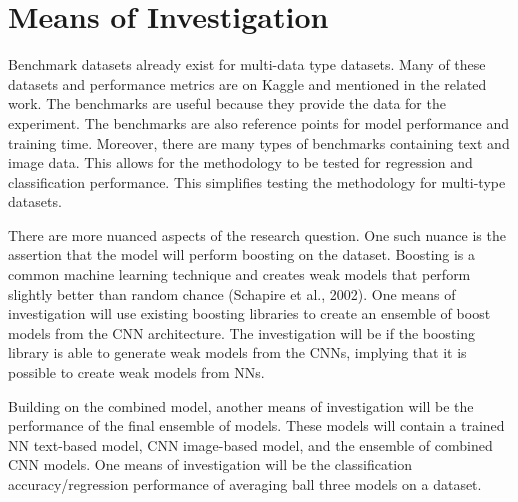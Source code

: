 \section{Means of Investigation} %

Benchmark datasets already exist for multi-data type datasets.  Many of these datasets and performance metrics are on Kaggle and mentioned in the related work.  The benchmarks are useful because they provide the data for the experiment.  The benchmarks are also reference points for model performance and training time.  Moreover, there are many types of benchmarks containing text and image data.  This allows for the methodology to be tested for regression and classification performance.  This simplifies testing the methodology for multi-type datasets.

There are more nuanced aspects of the research question.  One such nuance is the assertion that the model will perform boosting on the dataset.  Boosting is a common machine learning technique and creates weak models that perform slightly better than random chance (Schapire et al., 2002).  One means of investigation will use existing boosting libraries to create an ensemble of boost models from the CNN architecture.  The investigation will be if the boosting library is able to generate weak models from the CNNs, implying that it is possible to create weak models from NNs.  

Building on the combined model, another means of investigation will be the performance of the final ensemble of models.  These models will contain a trained NN text-based model, CNN image-based model, and the ensemble of combined CNN models.  One means of investigation will be the classification accuracy/regression performance of averaging ball three models on a dataset.





